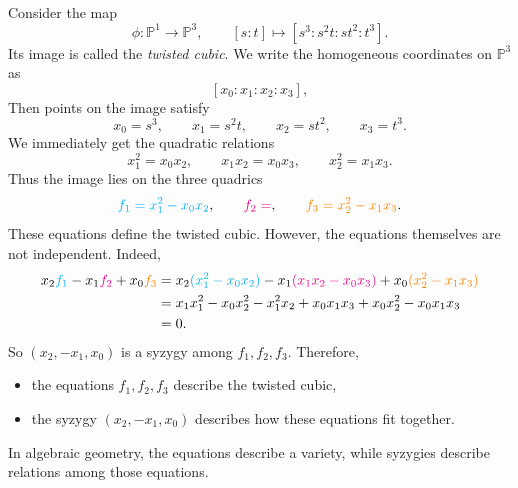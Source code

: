 \documentclass[11pt,openany]{article}
\begin{document}
\medskip

\begin{example}
Consider the map \[
\phi:\mathbb{P}^1\to \mathbb{P}^3,
\qquad
[s:t]\mapsto [s^3:s^2t:st^2:t^3].
\]
Its image is called the \emph{twisted cubic}. We write the homogeneous coordinates on \(\mathbb{P}^3\) as
\[
[x_0:x_1:x_2:x_3],
\] Then points on the image satisfy 
\[
x_0=s^3,\qquad x_1=s^2t,\qquad x_2=st^2,\qquad x_3=t^3.
\] We immediately get the quadratic relations
\[
x_1^2=x_0x_2,\qquad x_1x_2=x_0x_3,\qquad x_2^2=x_1x_3.
\]
Thus the image lies on the three quadrics
\[
{\color{cyan}f_1=x_1^2-x_0x_2},\qquad
{\color{magenta}f_2=},\qquad
{\color{orange}f_3=x_2^2-x_1x_3}.
\]
These equations define the twisted cubic. However, the equations themselves are not independent. Indeed,
\begin{align*}
x_2{\color{cyan}f_1}-x_1{\color{magenta}f_2}+x_0{\color{orange}f_3}&=x_2{\color{cyan}(x_1^2-x_0x_2)}-x_1{\color{magenta}(x_1x_2-x_0x_3)}+x_0{\color{orange}(x_2^2-x_1x_3)}\\
&=x_1x_1^2-x_0x_2^2-x_1^2x_2+x_0x_1x_3+x_0x_2^2-x_0x_1x_3\\
&=0.
\end{align*}
So \((x_2,-x_1,x_0)\) is a syzygy among \(f_1,f_2,f_3\). Therefore,

\begin{itemize}
	\item the equations \(f_1,f_2,f_3\) describe the twisted cubic,
	\item the syzygy \((x_2,-x_1,x_0)\) describes how these equations fit together.
\end{itemize}
In algebraic geometry, the equations describe a variety, while syzygies describe relations among those equations.
\end{example}

\newpage

\vfill
\end{document}
